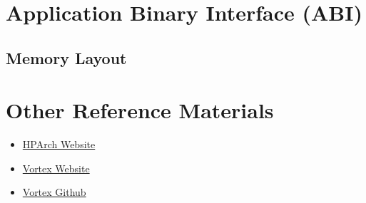 \documentclass{book}
\newcommand{\clearandresetpage}{%
  \clearpage
  \setcounter{page}{1}%
}
\begin{document}
\chapter{Application Binary Interface (ABI)}
\section{Memory Layout}


\appendix
\clearandresetpage %
\chapter{Other Reference Materials}
\begin{itemize}
    \item \href{https://sites.gatech.edu/hparch/research/}{HPArch Website}
    \item \href{https://vortex.cc.gatech.edu/}{Vortex Website}
    \item \href{https://github.com/vortexgpgpu/vortex} {Vortex Github}
\end{itemize}
\end{document}
